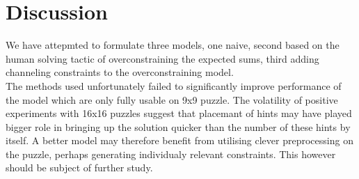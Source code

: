 \documentclass[10pt,a4paper,oneside]{article}
\begin{document}
\section{Discussion}
We have attepmted to formulate three models, one naive, second based on the human solving tactic of overconstraining the expected sums, third adding channeling constraints to the overconstraining model.\\ 
The methods used unfortunately failed to significantly improve performance of the model which are only fully usable on 9x9 puzzle. The volatility of positive experiments with 16x16 puzzles suggest that placemant of hints may have played bigger role in bringing up the solution quicker than the number of these hints by itself. A better model may therefore benefit from utilising clever preprocessing on the puzzle, perhaps generating individualy relevant constraints. This however should be subject of further study. 
\end{document}
